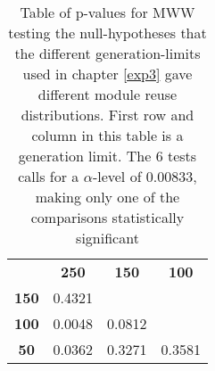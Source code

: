 \begin{table}[h]
    \centering
    \begin{tabular}{cccc}
        & \textbf{250} & \textbf{150} & \textbf{100} \\
    \textbf{150} & 0.4321 &        &        \\
    \textbf{100} & 0.0048 & 0.0812 &        \\
    \textbf{50}  & 0.0362 & 0.3271 & 0.3581
    \end{tabular}
    \caption[Experiment 3: P-table for generation-limit testing]{Table of p-values for MWW testing the null-hypotheses that the different generation-limits used in chapter \ref{exp3} gave different module reuse distributions. First row and column in this table is a generation limit. The 6 tests calls for a \(\alpha\)-level of 0.00833, making only one of the comparisons statistically significant}
    \label{tab:ptable.generationlimit}
\end{table}